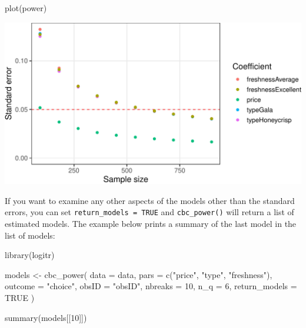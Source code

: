 \documentclass[
  12pt,
]{article}
\newenvironment{Shaded}{\begin{snugshade}}{\end{snugshade}}
\newcommand{\AttributeTok}[1]{\textcolor[rgb]{0.77,0.63,0.00}{#1}}
\newcommand{\ConstantTok}[1]{\textcolor[rgb]{0.00,0.00,0.00}{#1}}
\newcommand{\DecValTok}[1]{\textcolor[rgb]{0.00,0.00,0.81}{#1}}
\newcommand{\FunctionTok}[1]{\textcolor[rgb]{0.00,0.00,0.00}{#1}}
\newcommand{\NormalTok}[1]{#1}
\newcommand{\OtherTok}[1]{\textcolor[rgb]{0.56,0.35,0.01}{#1}}
\newcommand{\StringTok}[1]{\textcolor[rgb]{0.31,0.60,0.02}{#1}}
\begin{document}
\begin{Shaded}
\begin{Highlighting}[]
\FunctionTok{plot}\NormalTok{(power)}
\end{Highlighting}
\end{Shaded}

\includegraphics[width=522.144px]{figs/power-1}

If you want to examine any other aspects of the models other than the
standard errors, you can set \texttt{return\_models\ =\ TRUE} and
\texttt{cbc\_power()} will return a list of estimated models. The
example below prints a summary of the last model in the list of models:

\begin{Shaded}
\begin{Highlighting}[]
\FunctionTok{library}\NormalTok{(logitr)}

\NormalTok{models }\OtherTok{\textless{}{-}} \FunctionTok{cbc\_power}\NormalTok{(}
  \AttributeTok{data    =}\NormalTok{ data,}
  \AttributeTok{pars    =} \FunctionTok{c}\NormalTok{(}\StringTok{"price"}\NormalTok{, }\StringTok{"type"}\NormalTok{, }\StringTok{"freshness"}\NormalTok{),}
  \AttributeTok{outcome =} \StringTok{"choice"}\NormalTok{,}
  \AttributeTok{obsID   =} \StringTok{"obsID"}\NormalTok{,}
  \AttributeTok{nbreaks =} \DecValTok{10}\NormalTok{,}
  \AttributeTok{n\_q     =} \DecValTok{6}\NormalTok{,}
  \AttributeTok{return\_models =} \ConstantTok{TRUE}
\NormalTok{)}

\FunctionTok{summary}\NormalTok{(models[[}\DecValTok{10}\NormalTok{]])}
\end{Highlighting}
\end{Shaded}
\end{document}

